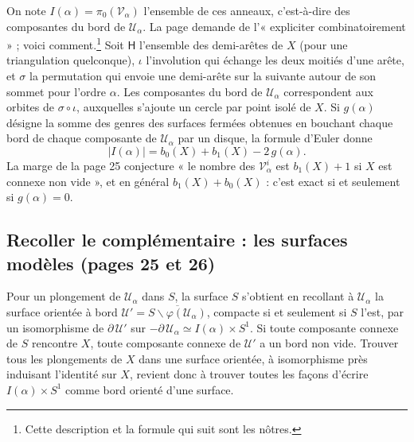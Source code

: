 \documentclass[11pt,a4paper]{article}
\begin{document}
On note $I(\alpha) = \pi_0(\mathcal{V}_\alpha)$ l'ensemble de ces anneaux,
c'est-à-dire des composantes du bord de $\mathcal{U}_\alpha$. La page demande
de l'« expliciter combinatoirement » ; voici comment.\footnote{Cette
description et la formule qui suit sont les nôtres.} Soit $\mathsf{H}$
l'ensemble des demi-arêtes de $X$ (pour une triangulation quelconque), $\iota$
l'involution qui échange les deux moitiés d'une arête, et $\sigma$ la
permutation qui envoie une demi-arête sur la suivante autour de son sommet
pour l'ordre $\alpha$. Les composantes du bord de $\mathcal{U}_\alpha$
correspondent aux orbites de $\sigma \circ \iota$, auxquelles s'ajoute un
cercle par point isolé de $X$. Si $g(\alpha)$ désigne la somme des genres des
surfaces fermées obtenues en bouchant chaque bord de chaque composante de
$\mathcal{U}_\alpha$ par un disque, la formule d'Euler donne
\[
|I(\alpha)| = b_0(X) + b_1(X) - 2\,g(\alpha).
\]
La marge de la page 25 conjecture « le nombre des $\mathcal{V}^{i}_\alpha$ est
$b_1(X) + 1$ si $X$ est connexe non vide », et en général
$b_1(X) + b_0(X)$ : c'est exact si et seulement si $g(\alpha) = 0$.

\subsection*{Recoller le complémentaire : les surfaces modèles (pages 25 et 26)}

Pour un plongement de $\mathcal{U}_\alpha$ dans $S$, la surface $S$ s'obtient
en recollant à $\mathcal{U}_\alpha$ la surface orientée à bord
$\mathcal{U}' = \overline{S \smallsetminus \varphi(\mathcal{U}_\alpha)}$,
compacte si et seulement si $S$ l'est, par un isomorphisme de
$\partial\,\mathcal{U}'$ sur $-\partial\,\mathcal{U}_\alpha \simeq I(\alpha) \times S^{1}$.
Si toute composante connexe de $S$ rencontre $X$, toute composante connexe de
$\mathcal{U}'$ a un bord non vide. Trouver tous les plongements de $X$ dans
une surface orientée, à isomorphisme près induisant l'identité sur $X$,
revient donc à trouver toutes les façons d'écrire $I(\alpha) \times S^{1}$
comme bord orienté d'une surface.
\end{document}
